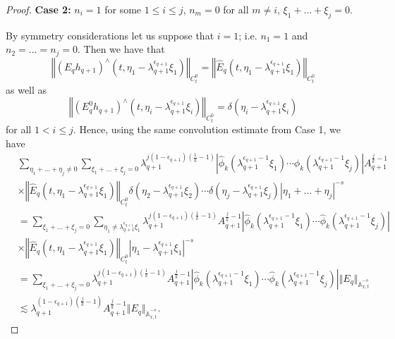 \documentclass[10pt,a4paper]{amsart}
\begin{document}
\begin{proof}
    \textbf{Case 2:} $n_i = 1$ for some $1 \leq i \leq j$, $n_m=0$ for all $m \not=i$, $\xi_1 + \ldots + \xi_j = 0$.

    By symmetry considerations let us suppose that $i = 1$; i.e. $n_1 = 1$ and $n_2=\ldots =n_j =0$. Then we have that
    $$
    \left\Vert \left(E_qh_{q+1}\right)^{\wedge}(t,\eta_1 - \lambda_{q+1}^{\epsilon_{q+1}} \xi_1)\right\Vert_{C_t^0} = \left\Vert \hat{E}_q(t,\eta_1 - \lambda_{q+1}^{\epsilon_{q+1}} \xi_1)\right\Vert_{C_t^0}
    $$
   as well as
   $$
   \left\Vert \left(E_q^{0} h_{q+1}\right)^{\wedge}(t,\eta_i - \lambda_{q+1}^{\epsilon_{q+1}} \xi_i) \right\Vert_{C_t^0} = \delta(\eta_i - \lambda_{q+1}^{\epsilon_{q+1}} \xi_i)
   $$
   for all $1 < i \leq j$. Hence, using the same convolution estimate from Case 1, we have
   \begin{equation}\label{eq:n=1_case}
       \begin{split}
           &\sum_{\eta_1 + \ldots + \eta_j \not=0} \sum_{\xi_1 + \ldots + \xi_j=0} \lambda_{q+1}^{j(1-\epsilon_{q+1})\left(\frac{1}{k} - 1\right)} \left|\hat{\phi}_k\left(\lambda_{q+1}^{\epsilon_{q+1}-1}\xi_1\right) \cdots \hat{\phi}_k\left(\lambda_{q+1}^{\epsilon_{q+1}-1}\xi_j\right)\right| A_{q+1}^{\frac{j}{k}-1}\\
           &\times \left\Vert \hat{E}_q(t,\eta_1 - \lambda_{q+1}^{\epsilon_{q+1}} \xi_1)\right\Vert_{C_t^0}\delta(\eta_2 - \lambda_{q+1}^{\epsilon_{q+1}} \xi_2) \cdots \delta(\eta_j - \lambda_{q+1}^{\epsilon_{q+1}} \xi_j) |\eta_1 + \ldots + \eta_j|^{-s}\\
           &= \sum_{\xi_1 + \ldots + \xi_j = 0}  \sum_{\eta_1 \not= \lambda_{q+1}^{\epsilon_{q+1}} \xi_1} \lambda_{q+1}^{j(1-\epsilon_{q+1})\left(\frac{1}{k}-1\right)}A_{q+1}^{\frac{j}{k}-1} \left|\hat{\phi}_k\left(\lambda_{q+1}^{\epsilon_{q+1}-1}\xi_1\right) \cdots \hat{\phi}_k\left(\lambda_{q+1}^{\epsilon_{q+1}-1}\xi_j\right)\right|\\
           &\times \left\Vert \hat{E}_q(t,\eta_1 - \lambda_{q+1}^{\epsilon_{q+1}} \xi_1)\right\Vert_{C_t^0} \left|\eta_1 -\lambda_{q+1}^{\epsilon_{q+1}} \xi_1\right|^{-s}\\
           &= \sum_{\xi_1 + \ldots + \xi_j = 0} \lambda_{q+1}^{j(1-\epsilon_{q+1})\left(\frac{1}{k}-1\right)} A_{q+1}^{\frac{j}{k}-1} \left|\hat{\phi}_k\left(\lambda_{q+1}^{\epsilon_{q+1}-1}\xi_1\right) \cdots \hat{\phi}_k\left(\lambda_{q+1}^{\epsilon_{q+1}-1}\xi_j\right)\right| \Vert E_q \Vert_{\dot{\mathbb{A}}_{x,t}^{-s}}\\
           &\lesssim \lambda_{q+1}^{(1-\epsilon_{q+1})\left(\frac{j}{k}-1\right)} A_{q+1}^{\frac{j}{k}-1} \Vert E_q \Vert_{\dot{\mathbb{A}}_{x,t}^{-s}}.
       \end{split}
   \end{equation}
    

\end{proof}
\end{document}

